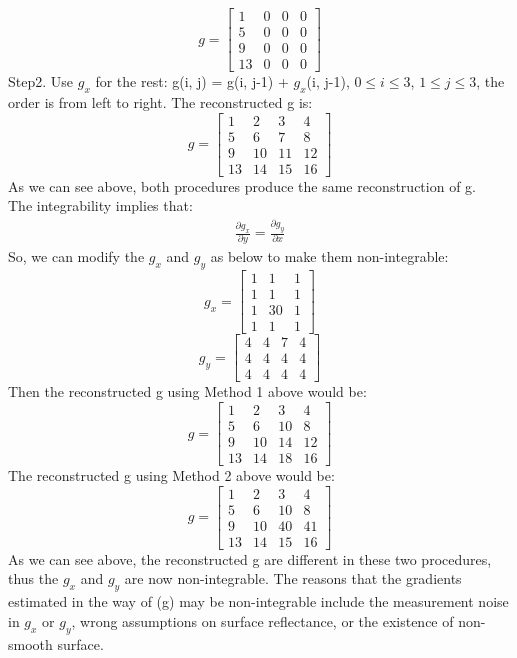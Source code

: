 \documentclass{article}
\begin{document}
	\[
	g =	
	\begin{bmatrix}
		1 & 0 & 0 & 0 \\
		5 & 0 & 0 & 0 \\
		9 & 0 & 0 & 0 \\
		13 & 0 & 0 & 0
	\end{bmatrix}
	\]
	Step2. Use $g_x$ for the rest: g(i, j) = g(i, j-1) + $g_x$(i, j-1), $0\leq i \leq 3$, $1\leq j \leq 3$, the order is from left to right. The reconstructed g is:
	\[
	g =
	\begin{bmatrix}
		1 & 2 & 3 & 4 \\
		5 & 6 & 7 & 8 \\
		9 & 10 & 11 & 12 \\
		13 & 14 & 15 & 16
	\end{bmatrix}
	\]	
	As we can see above, both procedures produce the same reconstruction of g.\\
	The integrability implies that:
	\begin{align}
	\frac{\partial g_x}{\partial y} = \frac{\partial g_y}{\partial x}
	\end{align}	
	So, we can modify the $g_x$ and $g_y$ as below to make them non-integrable:
	\[
	g_x =
	\begin{bmatrix}
		1 & 1 & 1 \\
		1 & 1 & 1 \\
		1 & 30 & 1 \\
		1 & 1 & 1
	\end{bmatrix}
	\]
	\[
	g_y =
	\begin{bmatrix}
		4 & 4 & 7 & 4\\
		4 & 4 & 4 & 4 \\
		4 & 4 & 4 & 4 
	\end{bmatrix}
	\]
	Then the reconstructed g using Method 1 above would be:
	\[
	g =
	\begin{bmatrix}
		1 & 2 & 3 & 4 \\
		5 & 6 & 10 & 8 \\
		9 & 10 & 14 & 12 \\
		13 & 14 & 18 & 16
	\end{bmatrix}
	\]
	The reconstructed g using Method 2 above would be:
	\[
	g =
	\begin{bmatrix}
		1 & 2 & 3 & 4 \\
		5 & 6 & 10 & 8 \\
		9 & 10 & 40 & 41 \\
		13 & 14 & 15 & 16
	\end{bmatrix}
	\]
	As we can see above, the reconstructed g are different in these two procedures, thus the $g_x$ and $g_y$ are now non-integrable. The reasons that the gradients estimated in the way of (g) may be non-integrable include the measurement noise in $g_x$ or $g_y$, wrong assumptions on surface reflectance, or the existence of non-smooth surface.
	
\end{document}
